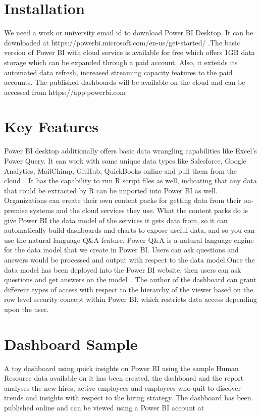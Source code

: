 \section{Installation}
We need a work or university email id to download Power BI Desktop. It can be 
downloaded at https://powerbi.microsoft.com/en-us/get-started/ .The basic 
version of Power BI with cloud service is available for free which offers 
1GB data storage which can be expanded through a paid account. Also, it extends
its automated data refresh, increased streaming capacity features to the paid 
accounts. The published dashboards will be available on the cloud and can be 
accessed from https://app.powerbi.com
 
\section{Key Features}
Power BI desktop additionally offers basic data wrangling capabilities like 
Excel's Power Query. It can work with some unique data types like Salesforce, 
Google Analytics, MailChimp, GitHub, QuickBooks online and pull them from the 
cloud~\cite{hid-sp18-418-powerbi-intro}.
It has the capability to run R script files as well, indicating that any data 
that could be extracted by R can be imported into Power BI as well. 
Organizations can create their own content packs for getting data from their 
on-premise systems and the cloud services they use. What the content packs do 
is give Power BI the data model of the services it gets data from, so it can 
automatically build dashboards and charts to expose useful data, and so you 
can use the natural language Q&A feature. Power Q&A is a natural language 
engine for the data model that we create in Power BI. Users can ask questions 
and answers would be processed and output with respect to the data model.Once 
the data model has been deployed into the Power BI website, then users can ask 
questions and get answers on the model~\cite{hid-sp18-418-powerbi-intro}.
The author of the dashboard can grant different types of access with respect 
to the hierarchy of the viewer based on the row level security concept within 
Power BI, which restricts data access depending upon the user.

 
\section{Dashboard Sample}
A toy dashboard using quick insights on Power BI using the sample Human 
Resource data available on it has been created, the dashboard and the report 
analyses the new hires, active employees and employees who quit to discover 
trends and insights with respect to the hiring strategy. The dashboard has 
been published online and can be viewed using a Power BI account at 

